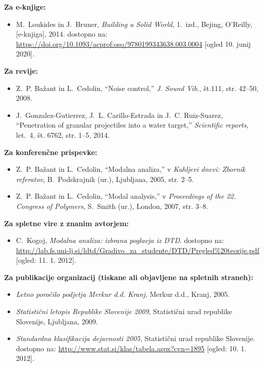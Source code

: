 \textbf{Za e-knjige:}
\begin{itemize}
	\item[{[4]}] M.~Loukides in J.~Bruner, \emph{Building a Solid World}, 
	1.~izd., 
	Bejing, O'Reilly, [e-knjiga], 2014. dostopno na:
	\url{https://doi.org/10.1093/acprof:oso/9780199343638.003.0004} [ogled 10.
	junij 2020].
\end{itemize}

\textbf{Za revije:}
\begin{itemize}
	\item[{[5]}] Z.~P. Ba\v{z}ant in L.~Cedolin, ``Noise control,'' \emph{J. 
	Sound 
		Vib.}, št.111, str. 42--50, 2008.\\
	\item[{[6]}] J.~Gonzalez-Gutierrez, J.~L. Carillo-Estrada in J.~C. 
	Ruiz-Suarez,
	``Penetration of granular projectiles into a water target,'' 
	\emph{Scientific
		reports}, let.~4, št. 6762, str. 1--5, 2014.
\end{itemize}

\textbf{Za konferenčne prispevke:}
\begin{itemize}
	\item[{[7]}] Z.~P. Ba\v{z}ant in L.~Cedolin, ``Modalna analiza,'' v 
	\emph{Kuhljevi dnevi: Zbornik referatov}, B.~Podskrajnik (ur.), Ljubljana, 
	2005, str. 2--5.\\
	
	\item[{[8]}] Z.~P. Ba\v{z}ant in L.~Cedolin, ``Modal analysis,'' v 
	\emph{Proceedings of the 22. Congress of Polymers}, S.~Smith (ur.), London, 
	2007, str. 3--8.\\
\end{itemize}

\textbf{Za spletne vire z znanim avtorjem:}
\begin{itemize}
	\item[{[9]}]C.~Kogoj, \emph{Modalna analiza: izbrana poglavja iz {DTD}}. 
	dostopno na: 
	\url{http://lab.fs.uni-lj.si/ldtd/Gradivo_za_studente/DTD/Pregled\%20teorije.pdf}
	[ogled: 11. 1. 2012].
\end{itemize}

\textbf{Za publikacije organizacij (tiskane ali objavljene na spletnih 
	straneh):}
\begin{itemize}
	\item[{[10]}] \emph{Letno poročilo podjetja {M}erkur d.d. {K}ranj}, {Merkur 
		d.d., Kranj}, 2005.\\
	
	\item[{[11]}] \emph{{Statistični letopis Republike Slovenije 2009}}, 
	Statistični urad republike Slovenije, Ljubljana, 2009.\\
	
	\item[{[12]}]\emph{Standardna klasifikacija dejavnosti 2005}, {Statistični 
	urad 
		republike Slovenije}. dostopno na: 
	\url{http://www.stat.si/klas/tabela.aspx?cvn=1895}
	[ogled: 10. 1. 2012].
\end{itemize}

